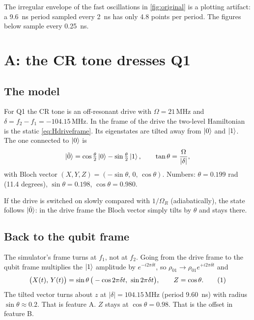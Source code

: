 \documentclass[11pt,a4paper]{article}
\newcommand{\MHz}{\,\mathrm{MHz}}
\newcommand{\eqlab}[1]{\refstepcounter{equation}\tag{\theequation}\label{#1}}
\begin{document}
The irregular envelope of the fast oscillations in \cref{fig:original} is a plotting artifact: a 9.6~ns period sampled
every 2~ns has only 4.8 points per period. The figures below sample every 0.25~ns.

\section{A: the CR tone dresses Q1}\label{sec:micro-drive}

\subsection{The model}

For Q1 the CR tone is an off-resonant drive with \(\Omega = 21\MHz\) and \(\delta = f_2 - f_1 = -104.15\MHz\). In the
frame of the drive the two-level Hamiltonian is the static \cref{eq:Hdriveframe}. Its eigenstates are tilted away
from \(\ket{0}\) and \(\ket{1}\). The one connected to \(\ket{0}\) is
\[
\ket{\tilde0} = \cos\tfrac{\theta}{2}\ket{0} - \sin\tfrac{\theta}{2}\ket{1},\qquad \tan\theta = \frac{\Omega}{|\delta|},
\]
with Bloch vector \((X,Y,Z) = (-\sin\theta,\,0,\,\cos\theta)\). Numbers: \(\theta = 0.199\) rad (11.4 degrees),
\(\sin\theta = 0.198\), \(\cos\theta = 0.980\).

If the drive is switched on slowly compared with \(1/\Omega_R\) (adiabatically), the state follows \(\ket{\tilde0}\): in
the drive frame the Bloch vector simply tilts by \(\theta\) and stays there.

\subsection{Back to the qubit frame}

The simulator's frame turns at \(f_1\), not at \(f_2\). Going from the drive frame to the qubit frame multiplies the
\(\ket{1}\) amplitude by \(e^{-i2\pi\delta t}\), so \(\rho_{01}\to\rho_{01}e^{+i2\pi\delta t}\) and
\[
\big(X(t),\,Y(t)\big) = \sin\theta\,\big(-\cos 2\pi\delta t,\ \sin 2\pi\delta t\big),\qquad Z = \cos\theta .
\eqlab{eq:circle}
\]
The tilted vector turns about \(z\) at \(|\delta| = 104.15\MHz\) (period 9.60~ns) with radius \(\sin\theta\approx0.2\).
That is feature A. \(Z\) stays at \(\cos\theta = 0.98\). That is the offset in feature B.
\end{document}
